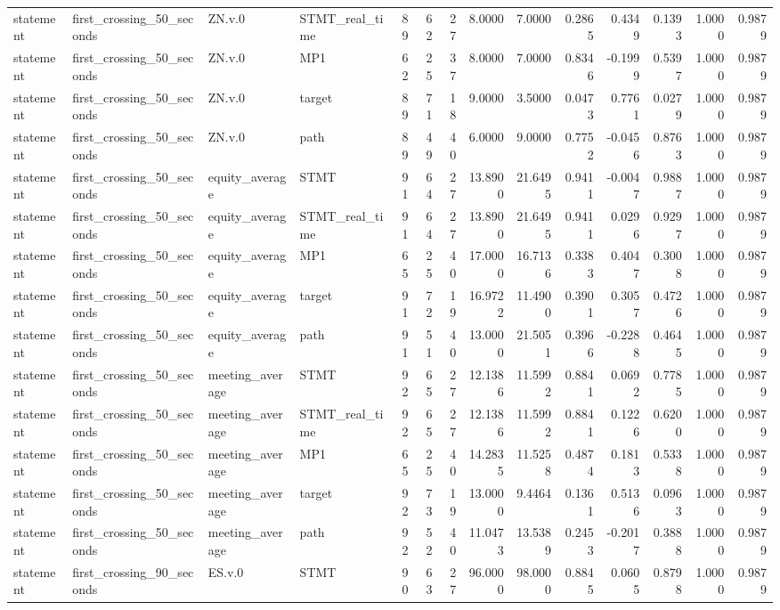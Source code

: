 \begin{tabular}{llllrrrrrrrrrr}
statement & first_crossing_50_seconds & ZN.v.0 & STMT_real_time & 89 & 62 & 27 & 8.0000 & 7.0000 & 0.2865 & 0.4349 & 0.1393 & 1.0000 & 0.9879 \\
statement & first_crossing_50_seconds & ZN.v.0 & MP1 & 62 & 25 & 37 & 8.0000 & 7.0000 & 0.8346 & -0.1999 & 0.5397 & 1.0000 & 0.9879 \\
statement & first_crossing_50_seconds & ZN.v.0 & target & 89 & 71 & 18 & 9.0000 & 3.5000 & 0.0473 & 0.7761 & 0.0279 & 1.0000 & 0.9879 \\
statement & first_crossing_50_seconds & ZN.v.0 & path & 89 & 49 & 40 & 6.0000 & 9.0000 & 0.7752 & -0.0456 & 0.8763 & 1.0000 & 0.9879 \\
statement & first_crossing_50_seconds & equity_average & STMT & 91 & 64 & 27 & 13.8900 & 21.6495 & 0.9411 & -0.0047 & 0.9887 & 1.0000 & 0.9879 \\
statement & first_crossing_50_seconds & equity_average & STMT_real_time & 91 & 64 & 27 & 13.8900 & 21.6495 & 0.9411 & 0.0296 & 0.9297 & 1.0000 & 0.9879 \\
statement & first_crossing_50_seconds & equity_average & MP1 & 65 & 25 & 40 & 17.0000 & 16.7136 & 0.3383 & 0.4047 & 0.3008 & 1.0000 & 0.9879 \\
statement & first_crossing_50_seconds & equity_average & target & 91 & 72 & 19 & 16.9722 & 11.4900 & 0.3901 & 0.3057 & 0.4726 & 1.0000 & 0.9879 \\
statement & first_crossing_50_seconds & equity_average & path & 91 & 51 & 40 & 13.0000 & 21.5051 & 0.3966 & -0.2288 & 0.4645 & 1.0000 & 0.9879 \\
statement & first_crossing_50_seconds & meeting_average & STMT & 92 & 65 & 27 & 12.1386 & 11.5992 & 0.8841 & 0.0692 & 0.7785 & 1.0000 & 0.9879 \\
statement & first_crossing_50_seconds & meeting_average & STMT_real_time & 92 & 65 & 27 & 12.1386 & 11.5992 & 0.8841 & 0.1226 & 0.6200 & 1.0000 & 0.9879 \\
statement & first_crossing_50_seconds & meeting_average & MP1 & 65 & 25 & 40 & 14.2835 & 11.5258 & 0.4874 & 0.1813 & 0.5338 & 1.0000 & 0.9879 \\
statement & first_crossing_50_seconds & meeting_average & target & 92 & 73 & 19 & 13.0000 & 9.4464 & 0.1361 & 0.5136 & 0.0963 & 1.0000 & 0.9879 \\
statement & first_crossing_50_seconds & meeting_average & path & 92 & 52 & 40 & 11.0473 & 13.5389 & 0.2453 & -0.2017 & 0.3888 & 1.0000 & 0.9879 \\
statement & first_crossing_90_seconds & ES.v.0 & STMT & 90 & 63 & 27 & 96.0000 & 98.0000 & 0.8845 & 0.0605 & 0.8798 & 1.0000 & 0.9879 \\

\end{tabular}
